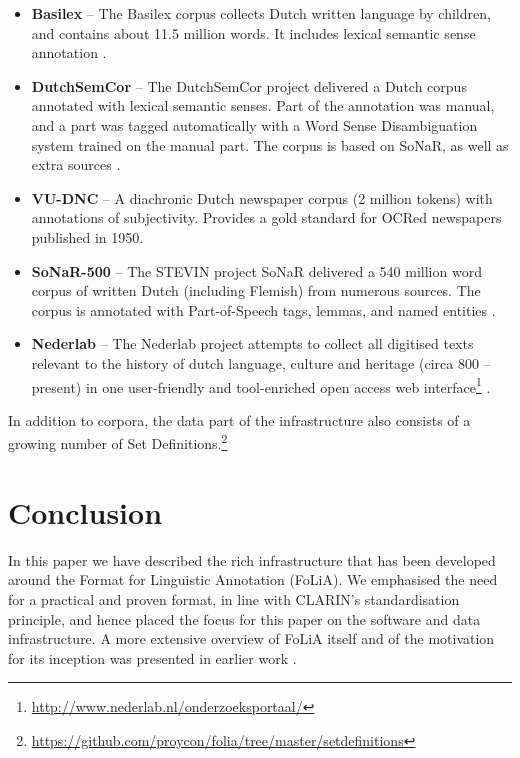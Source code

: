 \documentclass[a4paper,11pt]{article}
\begin{document}
\begin{itemize}
    \item \textbf{Basilex} -- The Basilex corpus collects Dutch written language by children,
        and contains about 11.5 million words. It includes lexical semantic sense
        annotation  \cite{BASILEX}.
    \item \textbf{DutchSemCor} -- The DutchSemCor project delivered a Dutch corpus annotated
        with lexical semantic senses. Part of the annotation was manual, and a
        part was tagged automatically with a Word Sense Disambiguation system trained on
        the manual part. The corpus is based on SoNaR, as well as extra
        sources  \cite{DUTCHSEMCOR}.
    \item \textbf{VU-DNC} -- A diachronic Dutch newspaper corpus (2 million tokens) with annotations of subjectivity. Provides a gold standard for OCRed newspapers published in 1950. \cite{VUDNC}
    \item \textbf{SoNaR-500} --  The STEVIN project SoNaR delivered a 540 million
        word corpus of written Dutch (including Flemish) from numerous sources.
        The corpus is annotated with Part-of-Speech tags, lemmas, and named
        entities  \cite{StevinSONAR2013}.
    \item \textbf{Nederlab} -- The Nederlab project attempts to collect all digitised texts relevant to the history of
        dutch language, culture and heritage (circa 800 -- present) in one user-friendly and tool-enriched open access
        web interface\footnote{\url{http://www.nederlab.nl/onderzoeksportaal/}} \cite{Nederlab2016}.
\end{itemize}

In addition to corpora, the data part of the infrastructure also consists of a
growing number of Set
Definitions.\footnote{\url{https://github.com/proycon/folia/tree/master/setdefinitions}}

\section{Conclusion}
\label{sec:conclusion}

In this paper we have described the rich infrastructure that has been developed around
the Format for Linguistic Annotation (FoLiA). We emphasised the need for a
practical and proven format, in line with CLARIN's standardisation principle,
and hence placed the focus for this paper on the software and data
infrastructure. A more extensive overview of FoLiA itself and of the motivation for its
inception was presented in earlier work \cite{FOLIACLIN2013}.
\end{document}
